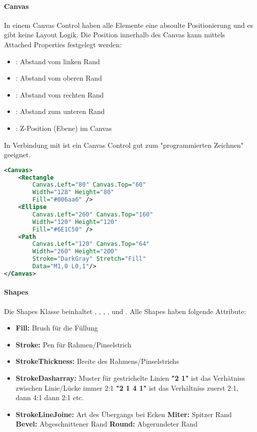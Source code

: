 \paragraph{Canvas} In einem Canvas Control haben alle Elemente eine absoulte Positionierung und es gibt keine Layout Logik. Die Position innerhalb des Canvas kann mittels Attached Properties festgelegt werden:
\begin{itemize}
\item {}: Abstand vom linken Rand
\item {}: Abstand vom oberen Rand
\item {}: Abstand vom rechten Rand
\item {}: Abstand zum unteren Rand
\item {}: Z-Position (Ebene) im Canvas
\end{itemize}
In Verbindung mit  ist ein Canvas Control gut zum "{}programmierten Zeichnen"{} geeignet.
\begin{lstlisting}[language=xml]
<Canvas>
    <Rectangle
        Canvas.Left="80" Canvas.Top="60"
        Width="128" Height="80"
        Fill="#006aa6" />
    <Ellipse
        Canvas.Left="260" Canvas.Top="160"
        Width="120" Height="120"
        Fill="#6E1C50" />
    <Path
        Canvas.Left="120" Canvas.Top="64"
        Width="260" Height="200"
        Stroke="DarkGray" Stretch="Fill"
        Data="M1,0 L0,1"/>
</Canvas>
\end{lstlisting}
\paragraph{Shapes} Die Shapes Klasse beinhaltet , , , ,  und . Alle Shapes haben folgende Attribute:
\begin{itemize}
\item \textbf{Fill:} Brush für die Füllung
\item \textbf{Stroke:} Pen für Rahmen/Pinselstrich
\item \textbf{StrokeThickness:} Breite des Rahmens/Pinselstrichs
\item \textbf{StrokeDasharray:} Muster für gestrichelte Linien
    \subitem \textbf{"{}2 1"{}} ist das Verhätniss zwischen Linie/Lücke immer 2:1
    \subitem \textbf{"{}2 1 4 1"{}} ist das Verhältniss zuerst 2:1, dann 4:1 dann 2:1 etc.
\item \textbf{StrokeLineJoine:} Art des Übergangs bei Ecken
    \subitem \textbf{Miter:} Spitzer Rand
    \subitem \textbf{Bevel:} Abgeschnittener Rand
    \subitem  \textbf{Round:} Abgerundeter Rand
\end{itemize}

